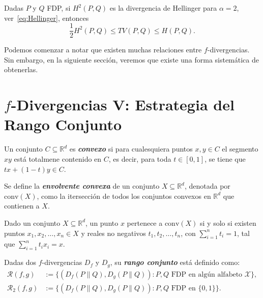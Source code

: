 \begin{theorem}
    Dadas $P$ y $Q$ FDP, si $H^2(P,Q)$ es la divergencia de Hellinger
    para $\alpha=2$, ver~\eqref{eq:Hellinger}, entonces
    \begin{equation}\label{eq:H2TVH}
        \frac{1}{2}H^2(P,Q)\leq TV(P,Q)\leq H(P,Q).
    \end{equation}
\end{theorem}

Podemos comenzar a notar que existen muchas relaciones entre $f$-divergencias. 
Sin embargo, en la siguiente secci\'on, veremos que existe una forma sistem\'atica de obtenerlas.  

\section{$f$-Divergencias V: Estrategia del Rango Conjunto}
\begin{definition}\cite{jivri2002lectures}
Un conjunto $C\subseteq\mathbb{R}^d$ es \textbf{\textit{convexo}} si para cualesquiera puntos $x,y\in C$ el segmento $xy$ est\'a totalmene contenido en $C$, es decir, para toda $t\in[0,1]$, se tiene que $tx+(1-t)y\in C$.
\end{definition}

\begin{definition}\cite{jivri2002lectures}
Se define la \textbf{\textit{envolvente convexa}} de un conjunto $X\subseteq\mathbb{R}^d$, denotada por $\text{conv}(X)$, como la itersecci\'on de todos los conjuntos convexos en $\mathbb{R}^d$ que contienen a $X$.   
\end{definition}

\begin{theorem}\cite{jivri2002lectures}
Dado un conjunto $X\subseteq\mathbb{R}^d$, un punto $x$ pertenece a $\text{conv}(X)$ si y solo si existen puntos $x_1,x_2,\dots,x_n\in X$ y reales no negativos $t_1,t_2,\dots,t_n$, con $\sum_{i=1}^{n}t_i=1$, tal que $\sum_{i=1}^{n}t_ix_i=x$.    
\end{theorem}

\begin{notation}\cite{harremoes2011pairs}
    Dadas dos $f$-divergencias $D_f$ y $D_g$, su \textit{\textbf{rango conjunto}} est\'a definido como:
    \begin{align*}
        \mathcal{R}(f,g)&:=\{(D_f(P\|Q),D_g(P\|Q))\colon P,Q\text{ FDP en alg\'un alfabeto $\mathcal{X}$}\},\\
        \mathcal{R}_2(f,g)&:=\{(D_f(P\|Q),D_g(P\|Q))\colon P,Q\text{ FDP en $\{0,1\}$}\}.
    \end{align*}
\end{notation}

